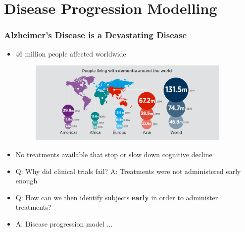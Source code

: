 
% 
% 
% 
% 

\section{Disease Progression Modelling}

\begin{frame}
\frametitle{Alzheimer's Disease is a Devastating Disease}

\vspace{-1em}
\begin{itemize}
 \item 46 million people affected worldwide
 
  \begin{figure}
 \centering
  \includegraphics[height=4cm]{adPrevalanceIncreasing}
 \end{figure}
 
  \item No treatments available that stop or slow down cognitive decline
  \item Q: Why did clinical trials fail? A: Treatments were not administered early enough 
 \vspace{1em}
  \item Q: How can we then identify subjects \textbf{early} in order to administer treatments? 
  \item A: Disease progression model ...
 

\end{itemize}

\vspace{-1em}

\end{frame}

\newcommand{\sz}{0.8}

